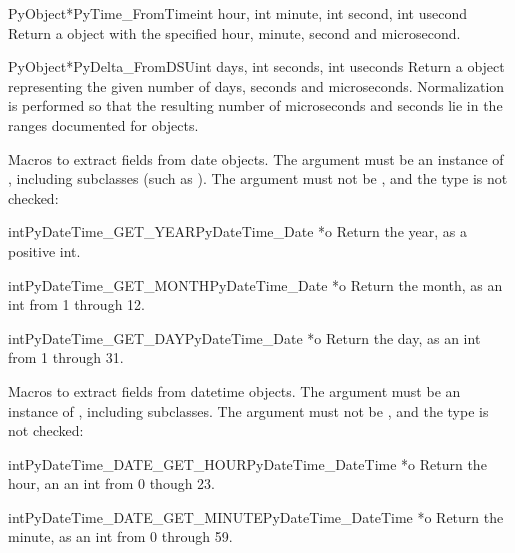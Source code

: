 \begin{cfuncdesc}{PyObject*}{PyTime_FromTime}{int hour, int minute,
        int second, int usecond}
  Return a  object with the specified hour, minute,
  second and microsecond.
\end{cfuncdesc}

\begin{cfuncdesc}{PyObject*}{PyDelta_FromDSU}{int days, int seconds,
        int useconds}
  Return a  object representing the given number
  of days, seconds and microseconds.  Normalization is performed so that
  the resulting number of microseconds and seconds lie in the ranges
  documented for  objects.
\end{cfuncdesc}

Macros to extract fields from date objects.  The argument must be an
instance of , including subclasses (such as
).  The argument must not be \NULL{}, and
the type is not checked:

\begin{cfuncdesc}{int}{PyDateTime_GET_YEAR}{PyDateTime_Date *o}
  Return the year, as a positive int.
\end{cfuncdesc}

\begin{cfuncdesc}{int}{PyDateTime_GET_MONTH}{PyDateTime_Date *o}
  Return the month, as an int from 1 through 12.
\end{cfuncdesc}

\begin{cfuncdesc}{int}{PyDateTime_GET_DAY}{PyDateTime_Date *o}
  Return the day, as an int from 1 through 31.
\end{cfuncdesc}

Macros to extract fields from datetime objects.  The argument must be an
instance of , including subclasses.
The argument must not be \NULL{}, and the type is not checked:

\begin{cfuncdesc}{int}{PyDateTime_DATE_GET_HOUR}{PyDateTime_DateTime *o}
  Return the hour, an an int from 0 though 23.
\end{cfuncdesc}

\begin{cfuncdesc}{int}{PyDateTime_DATE_GET_MINUTE}{PyDateTime_DateTime *o}
  Return the minute, as an int from 0 through 59.
\end{cfuncdesc}

